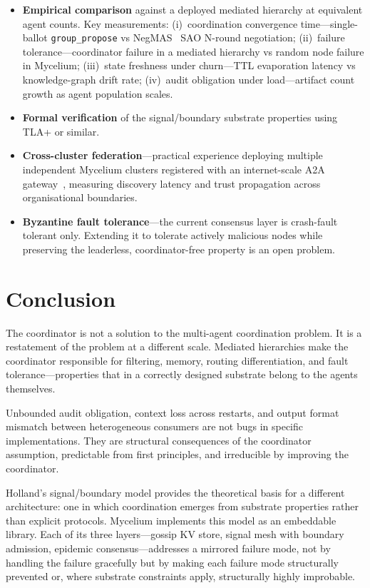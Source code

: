 \documentclass[11pt]{article}
\begin{document}
\begin{itemize}
\item \textbf{Empirical comparison} against a deployed mediated hierarchy at
  equivalent agent counts. Key measurements: (i)~coordination convergence
  time---single-ballot \texttt{group\_propose} vs NegMAS~\cite{negmas} SAO
  N-round negotiation; (ii)~failure tolerance---coordinator failure in a mediated
  hierarchy vs random node failure in Mycelium; (iii)~state freshness under
  churn---TTL evaporation latency vs knowledge-graph drift rate; (iv)~audit
  obligation under load---artifact count growth as agent population scales.

\item \textbf{Formal verification} of the signal/boundary substrate properties
  using TLA+ or similar.

\item \textbf{Cross-cluster federation}---practical experience deploying multiple
  independent Mycelium clusters registered with an internet-scale A2A
  gateway~\cite{nanda}, measuring discovery latency and trust propagation across
  organisational boundaries.

\item \textbf{Byzantine fault tolerance}---the current consensus layer is
  crash-fault tolerant only. Extending it to tolerate actively malicious nodes
  while preserving the leaderless, coordinator-free property is an open problem.
\end{itemize}

\section{Conclusion}

The coordinator is not a solution to the multi-agent coordination problem. It is a
restatement of the problem at a different scale. Mediated hierarchies make the
coordinator responsible for filtering, memory, routing differentiation, and fault
tolerance---properties that in a correctly designed substrate belong to the agents
themselves.

Unbounded audit obligation, context loss across restarts, and output format
mismatch between heterogeneous consumers are not bugs in specific implementations.
They are structural consequences of the coordinator assumption, predictable from
first principles, and irreducible by improving the coordinator.

Holland's signal/boundary model provides the theoretical basis for a different
architecture: one in which coordination emerges from substrate properties rather
than explicit protocols. Mycelium implements this model as an embeddable library.
Each of its three layers---gossip KV store, signal mesh with boundary admission,
epidemic consensus---addresses a mirrored failure mode, not by handling the
failure gracefully but by making each failure mode structurally prevented or,
where substrate constraints apply, structurally highly improbable.
\end{document}
